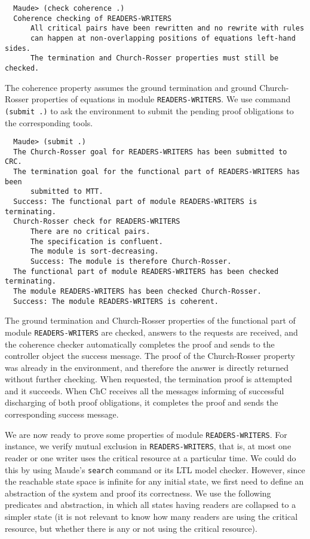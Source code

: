 \begin{small}
\begin{verbatim}
  Maude> (check coherence .)
  Coherence checking of READERS-WRITERS
      All critical pairs have been rewritten and no rewrite with rules 
      can happen at non-overlapping positions of equations left-hand sides.
      The termination and Church-Rosser properties must still be checked.
\end{verbatim}
\end{small}
%
The coherence property assumes the ground termination and 
ground Church-Rosser properties of equations in module \verb~READERS-WRITERS~.
We use command \verb~(submit .)~
to ask the environment to submit the pending proof obligations to the 
corresponding tools. 

\begin{small}
\begin{verbatim}
  Maude> (submit .)
  The Church-Rosser goal for READERS-WRITERS has been submitted to CRC.
  The termination goal for the functional part of READERS-WRITERS has been
      submitted to MTT.
  Success: The functional part of module READERS-WRITERS is terminating.
  Church-Rosser check for READERS-WRITERS
      There are no critical pairs.
      The specification is confluent.
      The module is sort-decreasing.
      Success: The module is therefore Church-Rosser.
  The functional part of module READERS-WRITERS has been checked terminating.
  The module READERS-WRITERS has been checked Church-Rosser.
  Success: The module READERS-WRITERS is coherent.
\end{verbatim}
\end{small}
%
The ground termination and Church-Rosser properties of the functional part of module
\verb~READERS-WRITERS~ are checked, answers to the requests are received, 
and the coherence checker automatically completes the proof and sends to the
controller object the success message. 
The proof of the Church-Rosser property was already in the 
environment, and therefore the answer is directly returned without further
checking. When requested, the termination proof is attempted and it succeeds. 
When ChC receives all the messages informing of successful discharging of both proof
obligations, it completes the proof and sends the corresponding success message. 

We are now ready to prove some properties of module \verb~READERS-WRITERS~. 
For instance, we verify mutual exclusion in \verb~READERS-WRITERS~, that is, 
at most one reader or one writer uses the critical resource at a particular time.
We could do this by using Maude's \verb~search~ command or its LTL model checker. However, 
since the reachable state space is infinite for any initial state, we first need to define an abstraction of the
system and proof its correctness. 
We use the following predicates and abstraction, 
in which all states having readers are collapsed to a simpler state (it is not relevant
to know how many readers are using the critical resource, 
but whether there is any or not using the critical resource).

